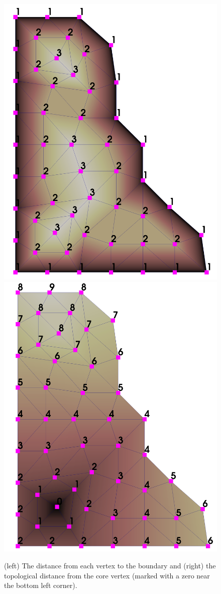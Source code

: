 \begin{figure} [H] \centering
  \includegraphics[width=.42\textwidth]{figs/compDist/2dTreeDepth.png}
  \includegraphics[width=.42\textwidth]{figs/compDist/2dDistance.png}
  \caption{
    (left) The distance from each vertex to the boundary and (right) the
    topological distance from the core vertex (marked with a zero near the
    bottom left corner).
  }
  \label{fig:compDistance}
\end{figure}

